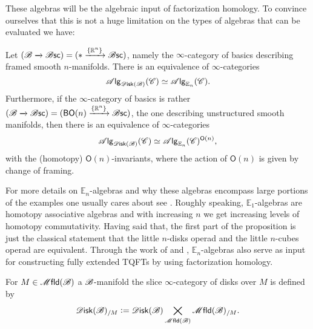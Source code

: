 \documentclass[../text]{subfiles}
\begin{document}
These algebras will be the algebraic input of factorization homology. To convince ourselves that this is not a huge limitation on the types of algebras that can be evaluated we have:
%
\begin{proposition}\label{prop:framed_ndisk=En}
    Let $(\mathscr{B} \xrightarrow{} \mathscr{B} \mathsf{sc}) = (* \xrightarrow{\{ \mathbb{R}^n\}} \mathscr{B} \mathsf{sc})$, namely the $\infty$-category of basics describing framed smooth $n$-manifolds. There is an equivalence of $\infty$-categories
    \begin{equation}
        \alg{\disk(\bstr)} (\catC) \simeq \alg{\mathbb{E}_n} (\catC).
    \end{equation}
    Furthermore, if the $\infty$-category of basics is rather $(\mathscr{B} \xrightarrow{} \mathscr{B} \mathsf{sc}) = (\mathsf{BO}(n) \xrightarrow{\{ \mathbb{R}^n\}} \mathscr{B} \mathsf{sc})$, the one describing unstructured smooth manifolds, then there is an equivalence of $\infty$-categories
    \begin{equation}
        \alg{\disk(\bstr)} (\catC) \simeq \alg{\mathbb{E}_n}(\catC)^{\mathsf{O}(n)},
    \end{equation}
    with the (homotopy) $\mathsf{O}(n)$-invariants, where the action of $\mathsf{O}(n)$ is given by change of framing.
\end{proposition}

\begin{remark}
    For more details on $\mathbb{E}_n$-algebras and why these algebras encompass large portions of the examples one usually cares about see \cite[sec.5.1]{lurie_ha}. %
    Roughly speaking, $\mathbb{E}_1$-algebras are homotopy associative algebras and with increasing $n$ we get increasing levels of homotopy commutativity. Having said that, the first part of the proposition is just the classical statement that the little $n$-disks operad and the little $n$-cubes operad are equivalent. Through the work of \cite{lurie_tqft} and \cite{scheimbauer2014}, $\mathbb{E}_n$-algebras also serve as input for constructing fully extended TQFTs by using factorization homology.
\end{remark}

\begin{definition}
    For $M \in \mfld(\bstr)$ a $\mathscr{B}$-manifold the slice $\infty$-category of disks over $M$ is defined by
    \begin{equation}
        \disk(\bstr)_{/M} := \disk(\bstr) \bigtimes\limits_{\mfld(\bstr)} \mfld(\bstr)_{/M}.
    \end{equation}
\end{definition}
\end{document}

